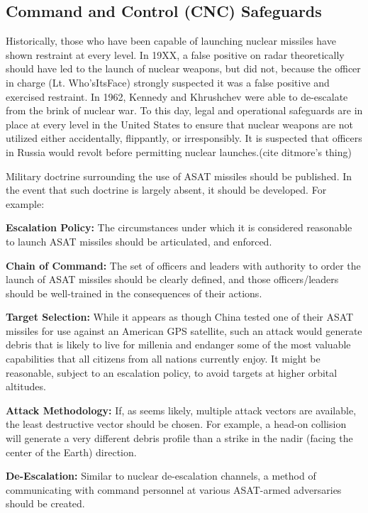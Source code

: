 \subsection{Command and Control (CNC) Safeguards}
Historically, those who have been capable of launching nuclear
missiles have shown restraint at every level.  In 19XX, a false
positive on radar theoretically should have led to the launch of
nuclear weapons, but did not, because the officer in charge
(Lt. Who'sItsFace) strongly suspected it was a false positive and
exercised restraint.  In 1962, Kennedy and Khrushchev were able to
de-escalate from the brink of nuclear war.  To this day, legal and
operational safeguards are in place at every level in the United
States to ensure that nuclear weapons are not utilized either
accidentally, flippantly, or irresponsibly.  It is suspected that
officers in Russia would revolt before permitting nuclear
launches.(cite ditmore's thing)

Military doctrine surrounding the use of ASAT missiles should be
published.  In the event that such doctrine is largely absent, it
should be developed.  For example:

\textbf{Escalation Policy:} The circumstances under which it is
considered reasonable to launch ASAT missiles should be articulated,
and enforced.

\textbf{Chain of Command:} The set of officers and leaders with
authority to order the launch of ASAT missiles should be clearly
defined, and those officers/leaders should be well-trained in the
consequences of their actions.

\textbf{Target Selection:} While it appears as though China tested one
of their ASAT missiles for use against an American GPS satellite, such
an attack would generate debris that is likely to live for millenia
and endanger some of the most valuable capabilities that all citizens
from all nations currently enjoy.  It might be reasonable, subject to
an escalation policy, to avoid targets at higher orbital altitudes.

\textbf{Attack Methodology:} If, as seems likely, multiple attack
vectors are available, the least destructive vector should be chosen.
For example, a head-on collision will generate a very different debris
profile than a strike in the nadir (facing the center of the Earth)
direction.

\textbf{De-Escalation:} Similar to nuclear de-escalation channels, a
method of communicating with command personnel at various ASAT-armed
adversaries should be created.

